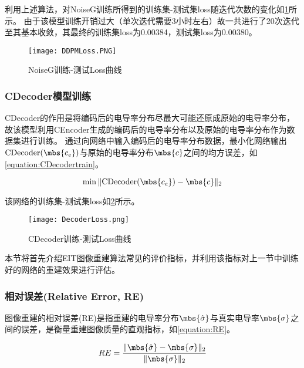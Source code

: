 利用上述算法，对NoiseG训练所得到的训练集-测试集loss随迭代次数的变化如\cref{figure:DDPMLoss}所示。
由于该模型训练开销过大（单次迭代需要3小时左右）故一共进行了20次迭代至其基本收敛，其最终的训练集loss为0.00384，测试集loss为0.00380。

\begin{figure}[H]
    \centering
    \texttt{[image: DDPMLoss.PNG]}
    \caption{NoiseG训练-测试Loss曲线}
    \label{figure:DDPMLoss}
\end{figure}

\subsubsection{CDecoder模型训练}

CDecoder的作用是将编码后的电导率分布尽最大可能还原成原始的电导率分布，故该模型利用CEncoder生成的编码后的电导率分布以及原始的电导率分布作为数据集进行训练。
通过向网络中输入编码后的电导率分布数据，最小化网络输出$\text{CDecoder}(\mbs{c_e})$与原始的电导率分布$\mbs{c}$之间的均方误差，如\cref{equation:CDecodertrain}。

\begin{equation}
    \label{equation:CDecodertrain}
    \min \|\text{CDecoder}(\mbs{c_e}) - \mbs{c}\|_2
\end{equation}

该网络的训练集-测试集loss如\cref{figure:DecoderLoss}所示。
\begin{figure}[h]
    \centering
    \texttt{[image: DecoderLoss.png]}
    \caption{CDecoder训练-测试Loss曲线}
    \label{figure:DecoderLoss}
\end{figure} 


本节将首先介绍EIT图像重建算法常见的评价指标，并利用该指标对上一节中训练好的网络的重建效果进行评估。

\subsubsection{相对误差(Relative Error, RE)}

图像重建的相对误差(RE)是指重建的电导率分布$\mbs{\hat{\sigma}}$与真实电导率$\mbs{\sigma}$之间的误差，是衡量重建图像质量的直观指标，如\cref{equation:RE}。

\begin{equation}
    \label{equation:RE}
    RE = \frac{\| \mbs{\hat{\sigma}} - \mbs{\sigma}\|_2}{\|\mbs{\sigma}\|_2}
\end{equation}

